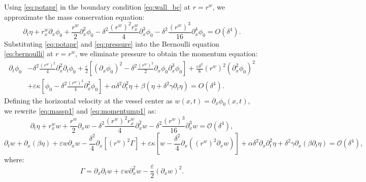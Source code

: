 \documentclass[alpha-refs, 12pt]{wiley-article}
\renewcommand{\O}{\mathcal{O}}
\begin{document}
Using \eqref{eq:potapr} in the boundary condition \eqref{eq:wall_bc} at $r = r^w$, we approximate the mass conservation equation:
\begin{equation}\label{eq:massp1}
  \partial_t \eta + r^w_x \partial_x \phi_0 + \frac{r^w}{2} \partial_x^2 \phi_0 - \delta^2 \frac{(r^w)^2 r^w_x}{4} \partial_x^3 \phi_0 - \delta^2 \frac{(r^w)^3}{16} \partial_x^4 \phi_0 = O(\delta^4).
\end{equation}
Substituting \eqref{eq:potapr} and \eqref{eq:pressure} into the Bernoulli equation \eqref{eq:bernoulli} at $r = r^w$, we eliminate pressure to obtain the momentum equation:
\begin{equation}\label{eq:momentump1}
\begin{split}
\partial_t \phi_0 & - \delta^2 \frac{(r^w)^2}{4} \partial_x^2 \partial_t \phi_0 + \frac{\varepsilon}{2} \left[ (\partial_x \phi_0)^2 - \delta^2 \frac{(r^w)^2}{2} \partial_x \phi_0 \partial_x^3 \phi_0 \right] + \frac{\varepsilon \delta^2}{8} (r^w)^2 (\partial_x^2 \phi_0)^2 \\
& + \varepsilon \kappa \left[ \phi_0 - \delta^2 \frac{(r^w)^2}{4} \partial_x^2 \phi_0 \right] + \alpha \delta^2 \partial_t^2 \eta + \beta (\eta + \delta^2 \gamma \partial_t \eta) = O(\delta^4).
\end{split}
\end{equation}
Defining the horizontal velocity at the vessel center as $w(x, t) = \partial_x \phi_0(x, t)$, we rewrite \eqref{eq:massp1} and \eqref{eq:momentump1} as:
\begin{equation}\label{eq:massp2}
  \partial_t \eta + r^w_x w + \frac{r^w}{2} \partial_x w - \delta^2 \frac{(r^w)^2 r^w_x}{4} \partial_x^2 w - \delta^2 \frac{(r^w)^3}{16} \partial_x^3 w = \O(\delta^4),
\end{equation}
\begin{equation}\label{eq:momentump2}
  \partial_t w + \partial_x (\beta \eta) + \varepsilon w \partial_x w - \frac{\delta^2}{4} \partial_x \left[ (r^w)^2 \Gamma \right] + \varepsilon \kappa \left[ w - \frac{\delta^2}{4} \partial_x \left( (r^w)^2 \partial_x w \right) \right] + \alpha \delta^2 \partial_x \partial_t^2 \eta + \delta^2 \gamma \partial_x (\beta \partial_t \eta) = \O(\delta^4),
\end{equation}
where:
\begin{equation}\label{eq:gamma}
  \Gamma = \partial_x \partial_t w + \varepsilon w \partial_x^2 w - \frac{\varepsilon}{2} (\partial_x w)^2.
\end{equation}
\end{document}
